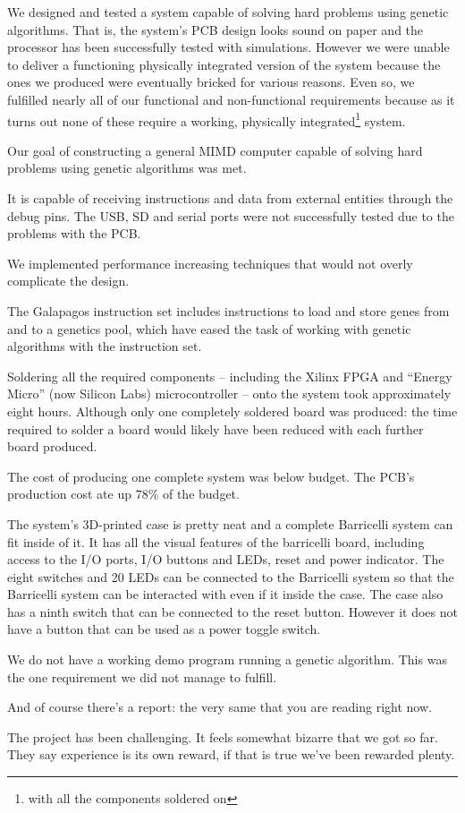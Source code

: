 We designed and tested a system capable of solving hard problems using genetic algorithms.
That is, the system's PCB design looks sound on paper and the processor has been successfully tested with simulations.
However we were unable to deliver a functioning physically integrated version of the system because the ones we produced were eventually bricked for various reasons.
Even so, we fulfilled nearly all of our functional and non-functional requirements because as it turns out none of these require a working, physically integrated\footnote{with all the components soldered on} system.

Our goal of constructing a general MIMD computer capable of solving hard problems using genetic algorithms was met.

It is capable of receiving instructions and data from external entities through the debug pins.
The USB, SD and serial ports were not successfully tested due to the problems with the PCB.

We implemented performance increasing techniques that would not overly complicate the design.

The Galapagos instruction set includes instructions to load and store genes from and to a genetics pool, which have eased the task of working with genetic algorithms with the instruction set.

Soldering all the required components -- including the Xilinx FPGA and ``Energy Micro'' (now Silicon Labs) microcontroller --  onto the system took approximately eight hours.
Although only one completely soldered board was produced: the time required to solder a board would likely have been reduced with each further board produced.

The cost of producing one complete system was below budget.
The PCB's production cost ate up $78\%$ of the budget.

The system's 3D-printed case is pretty neat and a complete Barricelli system can fit inside of it. 
It has all the visual features of the barricelli board, including access to the I/O ports, I/O buttons and LEDs, reset and power indicator.
The eight switches and 20 LEDs can be connected to the Barricelli system so that the Barricelli system can be interacted with even if it inside the case.
The case also has a ninth switch that can be connected to the reset button.
However it does not have a button that can be used as a power toggle switch.

We do not have a working demo program running a genetic algorithm.
This was the one requirement we did not manage to fulfill.

And of course there's a report: the very same that you are reading right now.

The project has been challenging.
It feels somewhat bizarre that we got so far.
They say experience is its own reward, if that is true we've been rewarded plenty.

